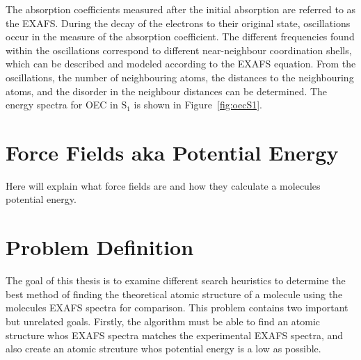 The absorption coefficients measured after the initial absorption are referred to as the EXAFS. During the decay of the electrons to their original state, oscillations occur in the measure of the absorption coefficient. The different frequencies found within the oscillations correspond to different near-neighbour coordination shells, which can be described and modeled according to the EXAFS equation. From the oscillations, the number of neighbouring atoms, the distances to the neighbouring atoms, and the disorder in the neighbour distances can be determined. The energy spectra for OEC in S$_{1}$ is shown in Figure~\ref{fig:oecS1}.

\begin{figure*}
	\caption{EXAFS Spectra of OEC in S$_{1}$}
	\label{fig:oecS1}
\end{figure*}

\section{Force Fields aka Potential Energy}

Here will explain what force fields are and how they calculate a molecules potential energy.

\section{Problem Definition}

The goal of this thesis is to examine different search heuristics to determine the best method of finding the theoretical atomic structure of a molecule using the molecules EXAFS spectra for comparison. This problem contains two important but unrelated goals. Firstly, the algorithm must be able to find an atomic structure whos EXAFS spectra matches the experimental EXAFS spectra, and also create an atomic strcuture whos potential energy is a low as possible.

